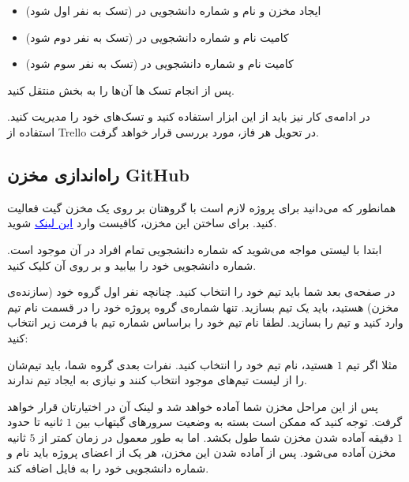 \documentclass[]{article}
\begin{document}
\begin{itemize}

\item
ایجاد مخزن  و  نام و شماره دانشجویی در  (تسک به نفر اول  شود)

\item
کامیت نام و شماره دانشجویی در  (تسک به نفر دوم  شود)

\item
کامیت نام و شماره دانشجویی در  (تسک به نفر سوم  شود)

\end{itemize}

پس از انجام تسک ها آن‌ها را به بخش  منتقل کنید.

در ادامه‌ی کار نیز باید از این ابزار استفاده کنید ‌و تسک‌های خود را مدیریت کنید. استفاده از Trello در تحویل هر فاز، مورد بررسی قرار خواهد گرفت.


\newpage
\subsection*{{\titr راه‌اندازی مخزن GitHub}}
\label{subsec:github}

همانطور که می‌دانید برای پروژه لازم است با گروهتان بر روی یک مخزن  گیت فعالیت کنید. برای ساختن این مخزن، کافیست وارد
 \href{https://classroom.github.com/g/tL0HyMWO}{\textcolor{blue}{\underline{این لینک}}} 
 شوید.

ابتدا با لیستی مواجه می‌شوید که شماره دانشجویی تمام افراد در آن موجود است. شماره دانشجویی خود را بیابید و بر روی آن کلیک کنید.

در صفحه‌ی بعد شما باید تیم خود را انتخاب کنید. چنانچه نفر اول گروه خود (سازنده‌ی مخزن) هستید، باید یک تیم بسازید. تنها شماره‌ی گروه پروژه خود را در قسمت نام تیم وارد کنید و تیم را بسازید. لطفا نام تیم خود را براساس شماره تیم با فرمت زیر انتخاب کنید:
\begin{flushleft}
\end{flushleft}


مثلا اگر تیم $1$ هستید، نام تیم خود را  انتخاب کنید. نفرات بعدی گروه شما، باید تیم‌شان را از لیست تیم‌های موجود انتخاب کنند و نیازی به ایجاد تیم ندارند.

پس از این مراحل مخزن شما آماده خواهد شد و لینک آن در اختیارتان قرار خواهد گرفت. توجه کنید که ممکن است بسته به وضعیت سرورهای گیتهاب بین $1$ ثانیه تا حدود $1$ دقیقه آماده شدن مخزن شما طول بکشد. اما به طور معمول در زمان کمتر از $5$ ثانیه مخزن آماده می‌شود. پس از آماده شدن این مخزن، هر یک از اعضای پروژه باید نام و شماره دانشجویی خود را به فایل  اضافه کند. 
\end{document}
